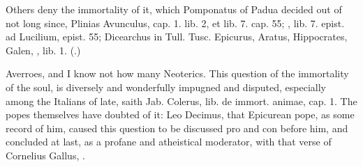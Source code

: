 {Others deny the immortality of it, which Pomponatus of Padua decided
out of \Aristotle not long since, Plinias Avunculus, cap. 1. lib. 2, et
lib. 7. cap. 55; \Seneca, lib. 7. epist. ad Lucilium, epist. 55;
Dicearchus in Tull. Tusc. Epicurus, Aratus, Hippocrates, Galen,
\Lucretius{}, lib. 1.
(.)

Averroes, and I know not how many Neoterics. This question of the
immortality of the soul, is diversely and wonderfully impugned and
disputed, especially among the Italians of late, saith Jab. Colerus,
lib. de immort. animae, cap. 1. The popes themselves have doubted of
it: Leo Decimus, that Epicurean pope, as some record of him,
caused this question to be discussed pro and con before him, and
concluded at last, as a profane and atheistical moderator, with that
verse of Cornelius Gallus, .

}
